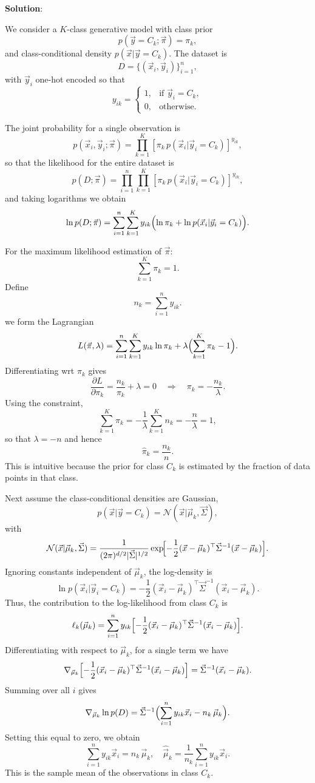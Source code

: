 \documentclass[submit]{../harvardml}
\newenvironment{solution}{
    \vspace{2mm}
    \color{blue}\noindent\textbf{Solution}:
}{}
\begin{document}
\begin{solution}
	

We consider a $K$-class generative model with class prior
\[
p(\vec{y}=C_k;\vec{\pi}) = \pi_k,
\]
and class-conditional density $p(\vec{x}|\vec{y}=C_k)$. The dataset is 
\[
D = \{(\vec{x}_i,\vec{y}_i)\}_{i=1}^n,
\]
with $\vec{y}_i$ one-hot encoded so that
\[
y_{ik} = \begin{cases} 1, & \text{if } \vec{y}_i = C_k, \\ 0, & \text{otherwise.} \end{cases}
\]

The joint probability for a single observation is
\[
p(\vec{x}_i,\vec{y}_i;\vec{\pi}) = \prod_{k=1}^K \left[\pi_k\, p(\vec{x}_i|\vec{y}_i=C_k)\right]^{y_{ik}},
\]
so that the likelihood for the entire dataset is
\[
p(D;\vec{\pi}) = \prod_{i=1}^n \prod_{k=1}^K \left[\pi_k\, p(\vec{x}_i|\vec{y}_i=C_k)\right]^{y_{ik}},
\]
and taking logarithms we obtain
\[
\ln p(D;\vec{\pi}) = \sum_{i=1}^n \sum_{k=1}^K y_{ik}\Bigl(\ln \pi_k + \ln p(\vec{x}_i|\vec{y}_i=C_k)\Bigr).
\]

For the maximum likelihood estimation of $\vec{\pi}$: 
\[
\sum_{k=1}^K \pi_k = 1.
\]
Define
\[
n_k = \sum_{i=1}^n y_{ik}.
\]
we form the Lagrangian
\[
L(\vec{\pi},\lambda) = \sum_{i=1}^n \sum_{k=1}^K y_{ik}\ln \pi_k + \lambda\Bigl(\sum_{k=1}^K \pi_k - 1\Bigr).
\]
Differentiating wrt $\pi_k$ gives
\[
\frac{\partial L}{\partial \pi_k} = \frac{n_k}{\pi_k} + \lambda = 0 \quad \Longrightarrow \quad \pi_k = -\frac{n_k}{\lambda}.
\]
Using the constraint,
\[
\sum_{k=1}^K \pi_k = -\frac{1}{\lambda}\sum_{k=1}^K n_k = -\frac{n}{\lambda} = 1,
\]
so that $\lambda = -n$ and hence
\[
\hat{\pi}_k = \frac{n_k}{n}.
\]
This is intuitive because the prior for class $C_k$ is estimated by the fraction of data points in that class.

Next assume the class-conditional densities are Gaussian,
\[
p(\vec{x}|\vec{y}=C_k)=\mathcal{N}(\vec{x}|\vec{\mu}_k,\vec{\Sigma}),
\]
with
\[
\mathcal{N}(\vec{x}|\vec{\mu}_k,\vec{\Sigma}) = \frac{1}{(2\pi)^{d/2}|\vec{\Sigma}|^{1/2}} \exp\!\Bigl[-\frac{1}{2}(\vec{x}-\vec{\mu}_k)^\top \vec{\Sigma}^{-1}(\vec{x}-\vec{\mu}_k)\Bigr].
\]
Ignoring constants independent of $\vec{\mu}_k$, the log-density is
\[
\ln p(\vec{x}_i|\vec{y}_i=C_k) = -\frac{1}{2}(\vec{x}_i-\vec{\mu}_k)^\top \vec{\Sigma}^{-1}(\vec{x}_i-\vec{\mu}_k).
\]
Thus, the contribution to the log-likelihood from class $C_k$ is
\[
\ell_k(\vec{\mu}_k) = \sum_{i=1}^n y_{ik}\Bigl[-\frac{1}{2}(\vec{x}_i-\vec{\mu}_k)^\top \vec{\Sigma}^{-1}(\vec{x}_i-\vec{\mu}_k)\Bigr].
\]
Differentiating with respect to $\vec{\mu}_k$, for a single term we have
\[
\nabla_{\vec{\mu}_k}\Bigl[-\frac{1}{2}(\vec{x}_i-\vec{\mu}_k)^\top \vec{\Sigma}^{-1}(\vec{x}_i-\vec{\mu}_k)\Bigr] = \vec{\Sigma}^{-1}(\vec{x}_i-\vec{\mu}_k).
\]
Summing over all $i$ gives
\[
\nabla_{\vec{\mu}_k}\ln p(D) = \vec{\Sigma}^{-1}\Bigl(\sum_{i=1}^n y_{ik}\vec{x}_i - n_k\,\vec{\mu}_k\Bigr).
\]
Setting this equal to zero, we obtain
\[
\sum_{i=1}^n y_{ik}\vec{x}_i = n_k\,\vec{\mu}_k, \quad \hat{\vec{\mu}}_k = \frac{1}{n_k}\sum_{i=1}^n y_{ik}\vec{x}_i.
\]
This is the sample mean of the observations in class $C_k$.


\end{solution}
\end{document}
